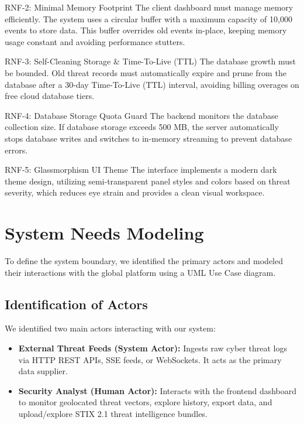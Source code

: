 \begin{subsubsection}{RNF-2: Minimal Memory Footprint}
The client dashboard must manage memory efficiently. The system uses a circular buffer with a maximum capacity of 10,000 events to store data. This buffer overrides old events in-place, keeping memory usage constant and avoiding performance stutters.
\end{subsubsection}

\begin{subsubsection}{RNF-3: Self-Cleaning Storage \& Time-To-Live (TTL)}
The database growth must be bounded. Old threat records must automatically expire and prune from the database after a 30-day Time-To-Live (TTL) interval, avoiding billing overages on free cloud database tiers.
\end{subsubsection}

\begin{subsubsection}{RNF-4: Database Storage Quota Guard}
The backend monitors the database collection size. If database storage exceeds 500 MB, the server automatically stops database writes and switches to in-memory streaming to prevent database errors.
\end{subsubsection}

\begin{subsubsection}{RNF-5: Glassmorphism UI Theme}
The interface implements a modern dark theme design, utilizing semi-transparent panel styles and colors based on threat severity, which reduces eye strain and provides a clean visual workspace.
\end{subsubsection}

\section{System Needs Modeling}
To define the system boundary, we identified the primary actors and modeled their interactions with the global platform using a UML Use Case diagram.

\subsection{Identification of Actors}
We identified two main actors interacting with our system:
\begin{itemize}
    \item \textbf{External Threat Feeds (System Actor):} Ingests raw cyber threat logs via HTTP REST APIs, SSE feeds, or WebSockets. It acts as the primary data supplier.
    \item \textbf{Security Analyst (Human Actor):} Interacts with the frontend dashboard to monitor geolocated threat vectors, explore history, export data, and upload/explore STIX 2.1 threat intelligence bundles.
\end{itemize}

